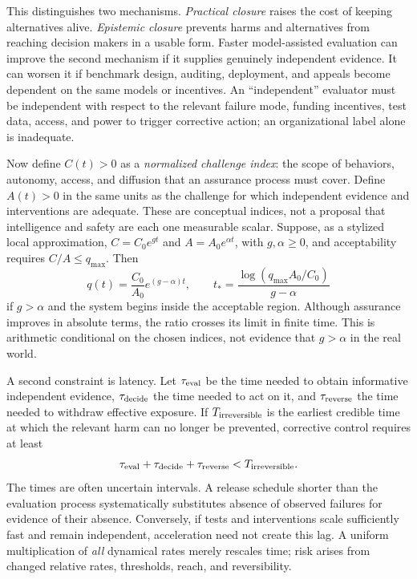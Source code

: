 \documentclass[11pt]{article}
\begin{document}
This distinguishes two mechanisms. \emph{Practical closure} raises the cost of keeping alternatives alive. \emph{Epistemic closure} prevents harms and alternatives from reaching decision makers in a usable form. Faster model-assisted evaluation can improve the second mechanism if it supplies genuinely independent evidence. It can worsen it if benchmark design, auditing, deployment, and appeals become dependent on the same models or incentives. An ``independent'' evaluator must be independent with respect to the relevant failure mode, funding incentives, test data, access, and power to trigger corrective action; an organizational label alone is inadequate.

Now define $C(t)>0$ as a \emph{normalized challenge index}: the scope of behaviors, autonomy, access, and diffusion that an assurance process must cover. Define $A(t)>0$ in the same units as the challenge for which independent evidence and interventions are adequate. These are conceptual indices, not a proposal that intelligence and safety are each one measurable scalar. Suppose, as a stylized local approximation, $C=C_0 e^{gt}$ and $A=A_0 e^{\alpha t}$, with $g,\alpha\geq0$, and acceptability requires $C/A\leq q_{\max}$. Then
\begin{equation}\label{eq:crossing}
q(t)=\frac{C_0}{A_0}e^{(g-\alpha)t},\qquad
t_*=\frac{\log(q_{\max}A_0/C_0)}{g-\alpha}
\end{equation}
if $g>\alpha$ and the system begins inside the acceptable region. Although assurance improves in absolute terms, the ratio crosses its limit in finite time. This is arithmetic conditional on the chosen indices, not evidence that $g>\alpha$ in the real world.

A second constraint is latency. Let $\tau_{\rm eval}$ be the time needed to obtain informative independent evidence, $\tau_{\rm decide}$ the time needed to act on it, and $\tau_{\rm reverse}$ the time needed to withdraw effective exposure. If $T_{\rm irreversible}$ is the earliest credible time at which the relevant harm can no longer be prevented, corrective control requires at least
\begin{equation}\label{eq:latency}
\tau_{\rm eval}+\tau_{\rm decide}+\tau_{\rm reverse}<T_{\rm irreversible}.
\end{equation}
The times are often uncertain intervals. A release schedule shorter than the evaluation process systematically substitutes absence of observed failures for evidence of their absence. Conversely, if tests and interventions scale sufficiently fast and remain independent, acceleration need not create this lag. A uniform multiplication of \emph{all} dynamical rates merely rescales time; risk arises from changed relative rates, thresholds, reach, and reversibility.
\end{document}

